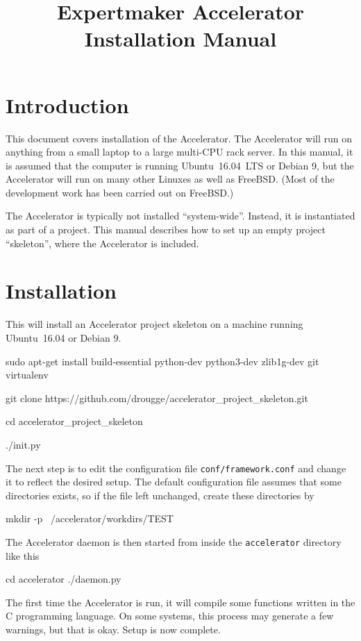 \documentclass[a4paper]{article}
\title{\vspace{-0.5cm}Expertmaker Accelerator Installation Manual\vspace{-0.5cm}}
\date{}
\begin{document}
\maketitle

\section{Introduction}

This document covers installation of the Accelerator.  The Accelerator
will run on anything from a small laptop to a large multi-CPU rack
server.  In this manual, it is assumed that the computer is running
Ubuntu~16.04~LTS or Debian 9, but the Accelerator will run on many
other Linuxes as well as FreeBSD.  (Most of the development work has
been carried out on FreeBSD.)

The Accelerator is typically not installed ``system-wide''.  Instead,
it is instantiated as part of a project.  This manual describes how to
set up an empty project ``skeleton'', where the Accelerator is
included.




\section{Installation}
\label{sec:quick}
This will install an Accelerator project skeleton on a machine running
Ubuntu~16.04 or Debian 9.
\begin{shell}
sudo apt-get install build-essential python-dev python3-dev zlib1g-dev git virtualenv

git clone https://github.com/drougge/accelerator_project_skeleton.git

cd accelerator_project_skeleton

./init.py
\end{shell}
The next step is to edit the configuration file
\texttt{conf/framework.conf} and change it to reflect the desired
setup.  The default configuration file assumes that some directories
exists, so if the file left unchanged, create these directories by
\begin{shell}
mkdir -p ~/accelerator/workdirs/TEST
\end{shell}
The Accelerator daemon is then started from inside the
\texttt{accelerator} directory like this
\begin{shell}
cd accelerator
./daemon.py  
\end{shell}
The first time the Accelerator is run, it will compile some functions
written in the C programming language.  On some systems, this process
may generate a few warnings, but that is okay.  Setup is now complete.
\thispagestyle{empty}
\end{document}

